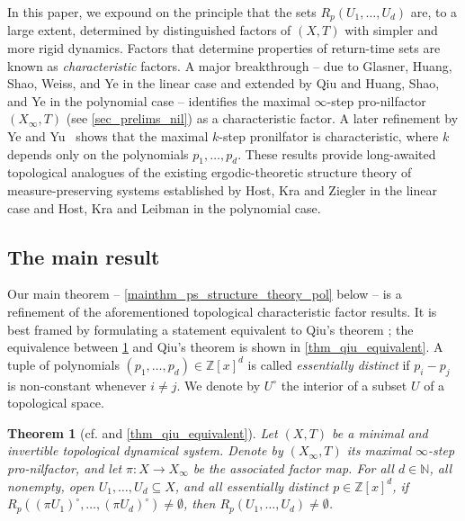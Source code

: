 \documentclass{article}
\theoremstyle{plain}
\newtheorem{theorem}[Theorem]{Theorem}
\theoremstyle{claim}
\theoremstyle{definition}
\theoremstyle{plain}
\theoremstyle{plain}
\newcommand{\N}{\mathbb{N}}
\newcommand{\Z}{\mathbb{Z}}
\newcommand{\1}{\boldsymbol{1}}
\begin{document}
In this paper, we expound on the principle that the sets $R_p(U_1,\ldots,U_d)$ are, to a large extent, determined by distinguished factors of $(X,T)$ with simpler and more rigid dynamics.
Factors that determine properties of return-time sets are known as \emph{characteristic} factors.
A major breakthrough -- due to Glasner, Huang, Shao, Weiss, and Ye \cite{glasner_huang_shao_weiss_ye_2020} in the linear case and extended by Qiu \cite{Qiu23} and Huang, Shao, and Ye \cite{huang_shao_ye_2023} in the polynomial case -- identifies the maximal $\infty$-step pro-nilfactor $(X_\infty,T)$ (see \cref{sec_prelims_nil}) as a characteristic factor.
A later refinement by Ye and Yu~\cite[Theorem~A]{yeyu} shows that the maximal $k$-step pronilfator is characteristic, where $k$ depends only on the polynomials $p_1,\ldots,p_d$.
These results provide long-awaited topological analogues of the existing ergodic-theoretic structure theory of measure-preserving systems established by Host, Kra \cite{Host_Kra05} and Ziegler \cite{Ziegler07} in the linear case and Host, Kra \cite{Host_Kra05b} and Leibman \cite{Leibman05} in the polynomial case.

\subsection{The main result}

Our main theorem -- \cref{mainthm_ps_structure_theory_pol} below -- is a refinement of the aforementioned topological characteristic factor results. It is best framed by formulating a statement equivalent to Qiu's theorem \cite[Theorem B]{Qiu23}; the equivalence between \cref{thm_qiu_eqiuvalent_statement} and Qiu's theorem is shown in \cref{thm_qiu_equivalent}.  A tuple of polynomials $(p_1, \ldots, p_d) \in \Z[x]^d$ is called {\it essentially distinct} if $p_i - p_j$ is non-constant whenever $i \neq j$. We denote by $U^\circ$ the interior of a subset $U$ of a topological space.

\begin{theorem}[{cf. \cite[Theorem B]{Qiu23} and \cref{thm_qiu_equivalent}}]
\label{thm_qiu_eqiuvalent_statement}
Let $(X,T)$ be a minimal and invertible topological dynamical system. Denote by $(X_\infty,T)$ its maximal $\infty$-step pro-nilfactor, and let $\pi\colon X\to X_\infty$ be the associated factor map.
For all $d \in \N$, all nonempty, open $U_1, \ldots, U_d \subseteq X$, and all essentially distinct $p \in \mathbb{Z}[x]^d$, if $R_p((\pi U_1)^\circ, \ldots, (\pi U_d)^\circ) \neq \emptyset$, then $R_p(U_1, \ldots, U_d) \neq \emptyset$.
\end{theorem}
\end{document}
